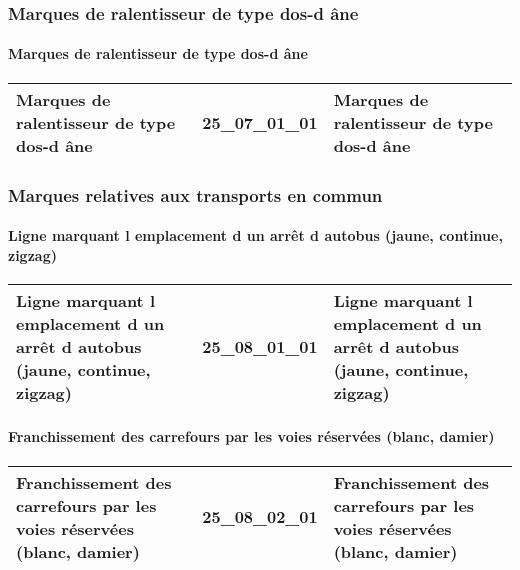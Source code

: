 \documentclass[12pt,titlepage]{book}
\begin{document}
\subsubsection{\large Marques de ralentisseur de type dos-d âne}
\paragraph{Marques de ralentisseur de type dos-d âne}
\noindent
\vspace{\baselineskip}

\renewcommand{\arraystretch}{1.2}
\begin{supertabular}{|p{10cm}|c|p{15cm}|}
 Marques de ralentisseur de type dos-d âne & 25\_07\_01\_01 & Marques de ralentisseur de type dos-d âne\\
\hline
\end{supertabular}

\subsubsection{\large Marques relatives aux transports en commun}
\paragraph{Ligne marquant l emplacement d un arrêt d autobus (jaune, continue, zigzag)}
\noindent
\vspace{\baselineskip}

\renewcommand{\arraystretch}{1.2}
\begin{supertabular}{|p{10cm}|c|p{15cm}|}
 Ligne marquant l emplacement d un arrêt d autobus (jaune, continue, zigzag) & 25\_08\_01\_01 & Ligne marquant l emplacement d un arrêt d autobus (jaune, continue, zigzag)\\
\hline
\end{supertabular}


\paragraph{Franchissement des carrefours par les voies réservées (blanc, damier)}
\noindent
\vspace{\baselineskip}

\renewcommand{\arraystretch}{1.2}
\begin{supertabular}{|p{10cm}|c|p{15cm}|}
 Franchissement des carrefours par les voies réservées (blanc, damier) & 25\_08\_02\_01 & Franchissement des carrefours par les voies réservées (blanc, damier)\\
\hline
\end{supertabular}
\end{document}
